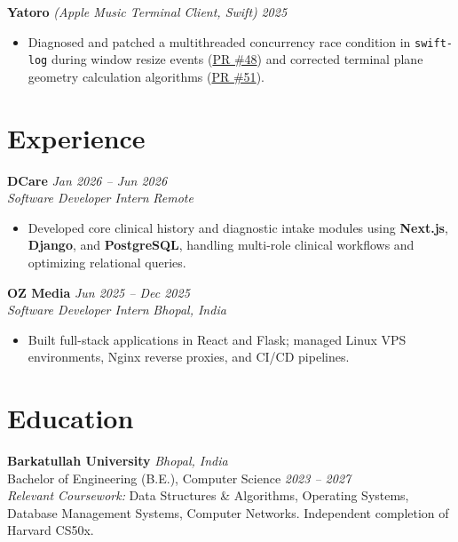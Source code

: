 \documentclass[10pt,a4paper]{article}
\begin{document}
\textbf{Yatoro} \textit{(Apple Music Terminal Client, Swift)} \hfill \textit{2025}
\begin{itemize}
    \item Diagnosed and patched a multithreaded concurrency race condition in \texttt{swift-log} during window resize events (\href{https://github.com/jayadamsmorgan/Yatoro/pull/48}{PR \#48}) and corrected terminal plane geometry calculation algorithms (\href{https://github.com/jayadamsmorgan/Yatoro/pull/51}{PR \#51}).
\end{itemize}

\section{Experience}
\textbf{DCare} \hfill \textit{Jan 2026 -- Jun 2026} \\
\textit{Software Developer Intern} \hfill \textit{Remote}
\begin{itemize}
    \item Developed core clinical history and diagnostic intake modules using \textbf{Next.js}, \textbf{Django}, and \textbf{PostgreSQL}, handling multi-role clinical workflows and optimizing relational queries.
\end{itemize}

\textbf{OZ Media} \hfill \textit{Jun 2025 -- Dec 2025} \\
\textit{Software Developer Intern} \hfill \textit{Bhopal, India}
\begin{itemize}
    \item Built full-stack applications in React and Flask; managed Linux VPS environments, Nginx reverse proxies, and CI/CD pipelines.
\end{itemize}

\section{Education}
\textbf{Barkatullah University} \hfill \textit{Bhopal, India} \\
Bachelor of Engineering (B.E.), Computer Science \hfill \textit{2023 -- 2027} \\
\textit{Relevant Coursework:} Data Structures \& Algorithms, Operating Systems, Database Management Systems, Computer Networks. Independent completion of Harvard CS50x.
\end{document}
